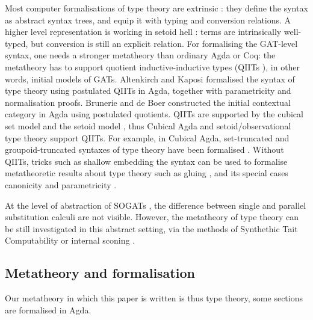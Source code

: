 \documentclass[sigplan,10pt,anonymous,review]{acmart}\settopmatter{printfolios=true,printccs=false,printacmref=false}
\begin{document}
Most computer formalisations of type theory are extrinsic
\cite{DBLP:journals/pacmpl/0001OV18,DBLP:conf/cpp/AdjedjLMPP24,DBLP:journals/jar/SozeauABCFKMTW20}:
they define the syntax as abstract syntax trees, and equip it with
typing and conversion relations. A higher level representation is
working in setoid hell \cite{chapman09eatitself}: terms are
intrinsically well-typed, but conversion is still an explicit
relation. For formalising the GAT-level syntax, one needs a stronger
metatheory than ordinary Agda or Coq: the metatheory has to support
quotient inductive-inductive types (QIITs
\cite{DBLP:journals/pacmpl/KaposiKA19}), in other words, initial
models of GATs. Altenkirch and Kaposi
\cite{DBLP:conf/popl/AltenkirchK16} formalised the syntax of type
theory using postulated QIITs in Agda, together with parametricity and
normalisation \cite{lmcs:4005} proofs. Brunerie and de Boer
\cite{initiality-agda} constructed the initial contextual category in
Agda using postulated quotients. QIITs are supported by the cubical
set model \cite{DBLP:conf/lics/CoquandHM18} and the setoid model
\cite{kaposi-qiit-setoid}, thus Cubical Agda
\cite{DBLP:journals/jfp/VezzosiMA21} and setoid/observational type
theory \cite{setoid,DBLP:phd/hal/Pujet22} support QIITs. For example,
in Cubical Agda, set-truncated and groupoid-truncated syntaxes of type
theory have been formalised \cite{cohtt}. Without QIITs, tricks such
as shallow embedding the syntax can be used to formalise metatheoretic
results about type theory such as gluing
\cite{kaposi_et_al:LIPIcs:2019:10532}, and its special cases
canonicity and parametricity \cite{kaposi-shallow}.

At the level of abstraction of SOGATs
\cite{uemura,DBLP:conf/fscd/KaposiX24}, the difference between single
and parallel substitution calculi are not visible. However, the
metatheory of type theory can be still investigated in this abstract
setting, via the methods of Synthethic Tait Computability
\cite{DBLP:phd/us/Sterling22} or internal sconing
\cite{DBLP:conf/fscd/BocquetKS23}.


\subsection{Metatheory and formalisation}

Our metatheory in which this paper is
written is thus type theory, some sections are formalised in Agda.
\end{document}
